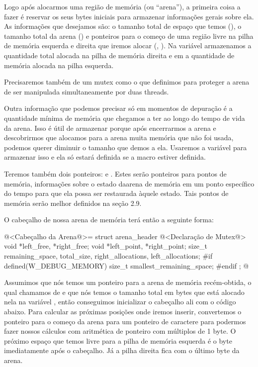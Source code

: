 Logo após alocarmos uma região de memória (ou ``arena''), a primeira
coisa a fazer é reservar os seus bytes iniciais para armazenar
informações gerais sobre ela. As informações que desejamos são: o
tamanho total de espaço que temos (), o
tamanho total da arena () e ponteiros para o
começo de uma região livre na pilha de memória esquerda e direita que
iremos alocar (, ). Na
variável  armazenamos a quantidade
total alocada na pilha de memória direita e
em  a quantidade de memória alocada na
pilha esquerda.

Precisaremos também de um mutex como o que definimos para proteger a
arena de ser manipulada simultaneamente por duas threads.

Outra informação que podemos precisar só em momentos de depuração é a
quantidade mínima de memória que chegamos a ter ao longo do tempo de
vida da arena. Isso é útil de armazenar porque após encerrarmos a
arena e descobrirmos que alocamos para a arena muita memória que não
foi usada, podemos querer diminuir o tamanho que demos a ela. Usaremos
a variável  para armazenar isso
e ela só estará definida se a macro 
estiver definida.

Teremos também dois ponteiros: 
e . Estes serão ponteiros para pontos de
memória, informações sobre o estado daarena de memória em um ponto
específico do tempo para que ela possa ser restaurada àquele
estado. Tais pontos de memória serão melhor definidos na seção 2.9.

O cabeçalho de nossa arena de memória terá então a seguinte forma:

\iniciocodigo
@<Cabeçalho da Arena@>=
struct arena_header{
  @<Declaração de Mutex@>
  void *left_free, *right_free;
  void *left_point, *right_point;
  size_t remaining_space, total_size, right_allocations, left_allocations;
#if defined(W_DEBUG_MEMORY)
  size_t smallest_remaining_space;
#endif
};
@
\fimcodigo

Assumimos que nós temos um ponteiro para a arena de memória
recém-obtida, o qual chamamos de  e que nós temos o
tamanho total em bytes que está alocado nela na
variável , então conseguimos inicializar o cabeçalho ali
com o código abaixo. Para calcular as próximas posições onde iremos
inserir, convertemos o ponteiro para o começo da arena para um
ponteiro de caractere para podermos fazer nossos cálculos com
aritmética de ponteiro com múltiplos de 1 byte. O próximo espaço que
temos livre para a pilha de memória esquerda é o byte imediatamente
após o cabeçalho. Já a pilha direita fica com o último byte da arena.

